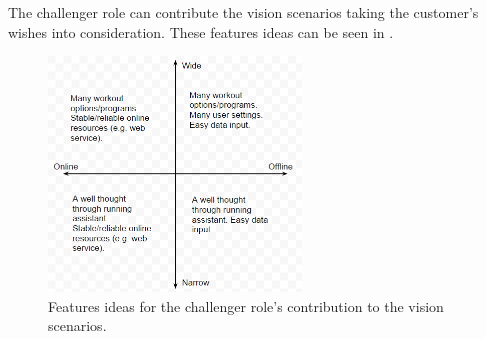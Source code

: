 
The challenger role can contribute the vision scenarios taking the customer's wishes into consideration. These features ideas can be seen in .

\begin{figure}[h!]
  \centering
    \includegraphics[width=0.6\textwidth]{Images/axis2.PNG}
    \caption{Features ideas for the challenger role's contribution to the vision scenarios.}
    \label{fig:axis2}
\end{figure}
